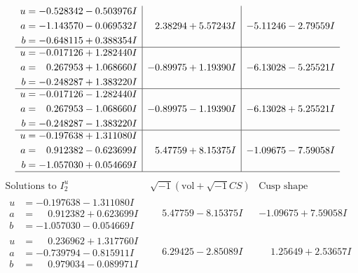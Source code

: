 \documentclass[1p]{elsarticle_modified}
\theoremstyle{definition}
\newcommand{\I}{\sqrt{-1}}
\begin{document}
$$\begin{array}{c|c|c}
\begin{aligned}
u &= -0.528342 - 0.503976 I \\
a &= -1.143570 - 0.069532 I \\
b &= -0.648115 + 0.388354 I\end{aligned}
 & \phantom{-}2.38294 + 5.57243 I & -5.11246 - 2.79559 I \\ \hline\begin{aligned}
u &= -0.017126 + 1.282440 I \\
a &= \phantom{-}0.267953 + 1.068660 I \\
b &= -0.248287 + 1.383220 I\end{aligned}
 & -0.89975 + 1.19390 I & -6.13028 - 5.25521 I \\ \hline\begin{aligned}
u &= -0.017126 - 1.282440 I \\
a &= \phantom{-}0.267953 - 1.068660 I \\
b &= -0.248287 - 1.383220 I\end{aligned}
 & -0.89975 - 1.19390 I & -6.13028 + 5.25521 I \\ \hline\begin{aligned}
u &= -0.197638 + 1.311080 I \\
a &= \phantom{-}0.912382 - 0.623699 I \\
b &= -1.057030 + 0.054669 I\end{aligned}
 & \phantom{-}5.47759 + 8.15375 I & -1.09675 - 7.59058 I\\
 \hline 
 \end{array}$$\newpage$$\begin{array}{c|c|c}  
\text{Solutions to }I^u_{2}& \I (\text{vol} + \sqrt{-1}CS) & \text{Cusp shape}\\
 \hline 
\begin{aligned}
u &= -0.197638 - 1.311080 I \\
a &= \phantom{-}0.912382 + 0.623699 I \\
b &= -1.057030 - 0.054669 I\end{aligned}
 & \phantom{-}5.47759 - 8.15375 I & -1.09675 + 7.59058 I \\ \hline\begin{aligned}
u &= \phantom{-}0.236962 + 1.317760 I \\
a &= -0.739794 - 0.815911 I \\
b &= \phantom{-}0.979034 - 0.089971 I\end{aligned}
 & \phantom{-}6.29425 - 2.85089 I & \phantom{-}1.25649 + 2.53657 I \\ \hline\begin{aligned}

\end{aligned}
\end{array}$$
\end{document}
